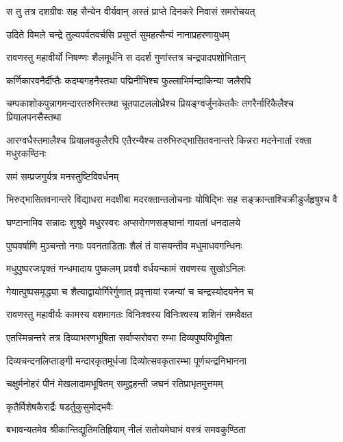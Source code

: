
\twolineshloka
{स तु तत्र दशग्रीवः सह सैन्येन वीर्यवान्}
{अस्तं प्राप्ते दिनकरे निवासं समरोचयत्} %

\twolineshloka
{उदिते विमले चन्द्रे तुल्यपर्वतवर्चसि}
{प्रसुप्तं सुमहत्सैन्यं नानाप्रहरणायुधम्} %

\twolineshloka
{रावणस्तु महावीर्यो निषण्णः शैलमूर्धनि}
{स ददर्श गुणांस्तत्र चन्द्रपादपशोभितान्} %

\twolineshloka
{कर्णिकारवनैर्दीप्तैः कदम्बगहनैस्तथा}
{पद्मिनीभिश्च फुल्लाभिर्मन्दाकिन्या जलैरपि} %

\threelineshloka
{चम्पकाशोकपुन्नागमन्दारतरुभिस्तथा}
{चूतपाटललोध्रैश्च प्रियङ्ग्वर्जुनकेतकैः}
{तगरैर्नारिकैलैश्च प्रियालपनसैस्तथा} %

\threelineshloka
{आरग्वधैस्तमालैश्च प्रियालवकुलैरपि}
{एतैरन्यैश्च तरुभिरुद्भासितवनान्तरे}
{किन्नरा मदनेनार्ता रक्ता मधुरकण्ठिनः} %

\onelineshloka
{समं सम्प्रजगुर्यत्र मनस्तुष्टिविवर्धनम्} %

\threelineshloka
{भिरुद्भासितवनान्तरे}
{विद्याधरा मदक्षीबा मदरक्तान्तलोचनाः}
{योषिद्भिः सह सङ्क्रान्ताश्चिक्रीडुर्जहृषुश्च वै} %

\twolineshloka
{घण्टानामिव सन्नादः शुश्रुवे मधुरस्वरः}
{अप्सरोगणसङ्घानां गायतां धनदालये} %

\twolineshloka
{पुष्पवर्षाणि मुञ्चन्तो नगाः पवनताडिताः}
{शैलं तं वासयन्तीव मधुमाधवगन्धिनः} %

\twolineshloka
{मधुपुष्परजःपृक्तं गन्धमादाय पुष्कलम्}
{प्रववौ वर्धयन्कामं रावणस्य सुखोऽनिलः} %

\twolineshloka
{गेयात्पुष्पसमृद्ध्या च शैत्याद्वायोर्गिरेर्गुणात्}
{प्रवृत्तायां रजन्यां च चन्द्रस्योदयनेन च} %

\twolineshloka
{रावणस्तु महावीर्यः कामस्य वशमागतः}
{विनिःश्वस्य विनिःश्वस्य शशिनं समवैक्षत} %

\twolineshloka
{एतस्मिन्नन्तरे तत्र दिव्याभरणभूषिता}
{सर्वाप्सरोवरा रम्भा दिव्यपुष्पविभूषिता} %

\twolineshloka
{दिव्यचन्दनलिप्ताङ्गी मन्दारकृतमूर्धजा}
{दिव्योत्सवकृतारम्भा पूर्णचन्द्रनिभानना} %

\twolineshloka
{चक्षुर्मनोहरं पीनं मेखलादामभूषितम्}
{समुद्वहन्ती जघनं रतिप्राभृतमुत्तमम्} %

\onelineshloka
{कृतैर्विशेषकैरार्द्रैः षडर्तुकुसुमोद्भवैः} %

\twolineshloka
{बभावन्यतमेव श्रीकान्तिद्युतिमतिह्रियाम्}
{नीलं सतोयमेघाभं वस्त्रं समवकुण्ठिता} %


